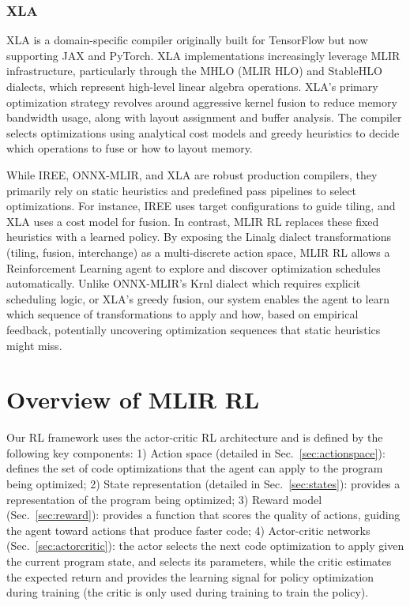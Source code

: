 \documentclass[10pt,twocolumn]{article}
\begin{document}
\subsubsection{XLA}
XLA \cite{ref51} is a domain-specific compiler originally built for TensorFlow but now supporting JAX and PyTorch. XLA implementations increasingly leverage MLIR infrastructure, particularly through the MHLO (MLIR HLO) and StableHLO dialects, which represent high-level linear algebra operations. XLA's primary optimization strategy revolves around aggressive kernel fusion to reduce memory bandwidth usage, along with layout assignment and buffer analysis. The compiler selects optimizations using analytical cost models and greedy heuristics to decide which operations to fuse or how to layout memory.

While IREE, ONNX-MLIR, and XLA are robust production compilers, they primarily rely on static heuristics and predefined pass pipelines to select optimizations. For instance, IREE uses target configurations to guide tiling, and XLA uses a cost model for fusion. In contrast, MLIR RL replaces these fixed heuristics with a learned policy. By exposing the Linalg dialect transformations (tiling, fusion, interchange) as a multi-discrete action space, MLIR RL allows a Reinforcement Learning agent to explore and discover optimization schedules automatically. Unlike ONNX-MLIR's Krnl dialect which requires explicit scheduling logic, or XLA's greedy fusion, our system enables the agent to learn which sequence of transformations to apply and how, based on empirical feedback, potentially uncovering optimization sequences that static heuristics might miss.

\section{Overview of MLIR RL}

Our RL framework uses the actor-critic RL architecture and is defined by the following key components: 1) Action space (detailed in Sec.~\ref{sec:actionspace}): defines the set of code optimizations that the agent can apply to the program being optimized; 2) State representation (detailed in Sec.~\ref{sec:states}): provides a representation of the program being optimized; 3) Reward model (Sec.~\ref{sec:reward}): provides a function that scores the quality of actions, guiding the agent toward actions that produce faster code; 4) Actor-critic networks (Sec.~\ref{sec:actorcritic}): the actor selects the next code optimization to apply given the current program state, and selects its parameters, while the critic estimates the expected return and provides the learning signal for policy optimization during training (the critic is only used during training to train the policy).
\end{document}
